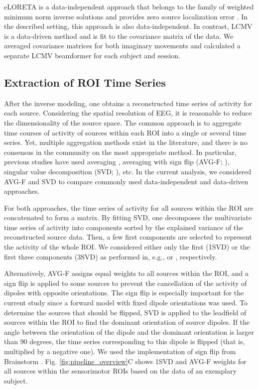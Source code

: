 \medskip

eLORETA is a data-independent approach that belongs to the family of weighted minimum norm inverse solutions and provides zero source localization error \citep{PascualMarqui2011}. In the described setting, this approach is also data-independent. In contrast, LCMV is a data-driven method and is fit to the covariance matrix of the data. We averaged covariance matrices for both imaginary movements and calculated a separate LCMV beamformer for each subject and session.

\subsection{Extraction of ROI Time Series}

After the inverse modeling, one obtains a reconstructed time series of activity for each source. Considering the spatial resolution of EEG, it is reasonable to reduce the dimensionality of the source space. The common approach is to aggregate time courses of activity of sources within each ROI into a single or several time series. Yet, multiple aggregation methods exist in the literature, and there is no consensus in the community on the most appropriate method. In particular, previous studies have used averaging \citep{Babiloni2005}, averaging with sign flip (AVG-F; \cite{Lai2018}), singular value decomposition (SVD; \cite{Rubega2019}), etc. In the current analysis, we considered AVG-F and SVD to compare commonly used data-independent and data-driven approaches. 

\medskip

For both approaches, the time series of activity for all sources within the ROI are concatenated to form a matrix. By fitting SVD, one decomposes the multivariate time series of activity into components sorted by the explained variance of the reconstructed source data. Then, a few first components are selected to represent the activity of the whole ROI. We considered either only the first (1SVD) or the first three components (3SVD) as performed in, e.g., \citep{Rubega2019, Pellegrini2023} or \citep{Vidaurre2020, Pellegrini2023}, respectively. 

\medskip

Alternatively, AVG-F assigns equal weights to all sources within the ROI, and a sign flip is applied to some sources to prevent the cancellation of the activity of dipoles with opposite orientations. The sign flip is especially important for the current study since a forward model with fixed dipole orientations was used. To determine the sources that should be flipped, SVD is applied to the leadfield of sources within the ROI to find the dominant orientation of source dipoles. If the angle between the orientation of the dipole and the dominant orientation is larger than 90 degrees, the time series corresponding to this dipole is flipped (that is, multiplied by a negative one). We used the implementation of sign flip from Brainstorm \citep{Brainstorm_Tadel2011}. Fig. \ref{fig:pipeline_overview}C shows 1SVD and AVG-F weights for all sources within the sensorimotor ROIs based on the data of an exemplary subject.

